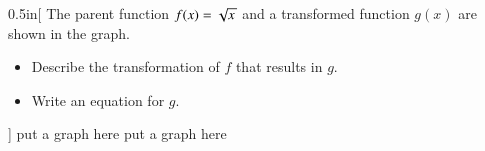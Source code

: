 
\begin{my2Problems}[\normalsize]{0.5in}[%
    The parent function $f(x)=\myRoot{x}$ and a transformed function $g(x)$
    are shown in the graph.
    \vspace{-1em}
    \begin{itemize}[nosep]
        \item Describe the transformation of $f$ that results in $g$.
        \item Write an equation for $g$.
    \end{itemize}
    ]
    {
        put a graph here
    }
    {
        put a graph here
    }
\end{my2Problems}

